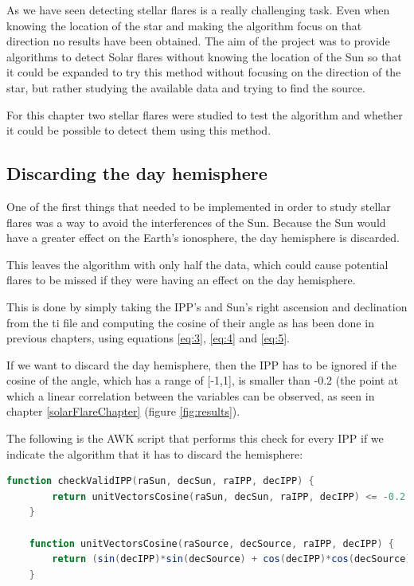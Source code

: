 As we have seen detecting stellar flares is a really challenging task. Even when knowing the location of the star and making the algorithm focus on that direction no results have been obtained. The aim of the project was to provide algorithms to detect Solar flares without knowing the location of the Sun so that it could be expanded to try this method without focusing on the direction of the star, but rather studying the available data and trying to find the source.

For this chapter two stellar flares were studied to test the algorithm and whether it could be possible to detect them using this method.

\subsection{Discarding the day hemisphere}

One of the first things that needed to be implemented in order to study stellar flares was a way to avoid the interferences of the Sun. Because the Sun would have a greater effect on the Earth's ionosphere, the day hemisphere is discarded.

This leaves the algorithm with only half the data, which could cause potential flares to be missed if they were having an effect on the day hemisphere.

This is done by simply taking the IPP's and Sun's right ascension and declination from the ti file and computing the cosine of their angle as has been done in previous chapters, using equations \ref{eq:3}, \ref{eq:4} and \ref{eq:5}.

If we want to discard the day hemisphere, then the IPP has to be ignored if the cosine of the angle, which has a range of [-1,1], is smaller than -0.2 (the point at which a linear correlation between the variables can be observed, as seen in chapter \ref{solarFlareChapter} (figure \ref{fig:results}).

The following is the AWK script that performs this check for every IPP if we indicate the algorithm that it has to discard the hemisphere:

\begin{minipage}{\linewidth}
	\begin{lstlisting}[language=awk, caption=Discarding the day hemisphere]
	function checkValidIPP(raSun, decSun, raIPP, decIPP) {
		return unitVectorsCosine(raSun, decSun, raIPP, decIPP) <= -0.2
	}
	
	function unitVectorsCosine(raSource, decSource, raIPP, decIPP) {
		return (sin(decIPP)*sin(decSource) + cos(decIPP)*cos(decSource)*cos(raIPP - raSource));
	}
\end{lstlisting}
\end{minipage}

